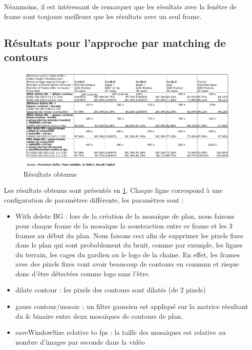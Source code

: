 \documentclass[11pt]{article}
\begin{document}
Néanmoins, il est intéressant de remarquer que les résultats avec la fenêtre de frame sont toujours meilleurs que les résultats avec un seul frame.\\

\subsection{Résultats pour l'approche par matching de contours}
\label{sec:org27dd034}
\begin{figure}[htbp]
\centering
\includegraphics[width=17cm]{res_match_contour.png}
\caption{Résultats obtenus \label{res-match-contour}}
\end{figure}
Les résultats obtenus sont présentés en \ref{res-match-contour}. Chaque ligne correspond à une configuration de paramètres différente, les paramètres sont :\\
\begin{itemize}
\item With delete BG : lors de la création de la mosaïque de plan, nous faisons pour chaque frame de la mosaïque la soustraction entre ce frame et les 3 frames au début du plan. Nous faisons ceci afin de supprimer les pixels fixes dans le plan qui sont probablement du bruit, comme par exemple, les lignes du terrain, les cages du gardien ou le logo de la chaine. En effet, les frames avec des pixels fixes vont avoir beaucoup de contours en commun et risque donc d'être détectées comme logo sans l'être.\\
\item dilate contour : les pixels des contours sont dilatés (de 2 pixels)\\
\item gauss contour/mosaic : un filtre gaussien est appliqué sur la matrice résultant du \& binaire entre deux mosaïques de contours de plan.\\
\item saveWindowSize relative to fps : la taille des mosaïques est relative au nombre d'images par seconde dans la vidéo\\
\end{itemize}
\end{document}
